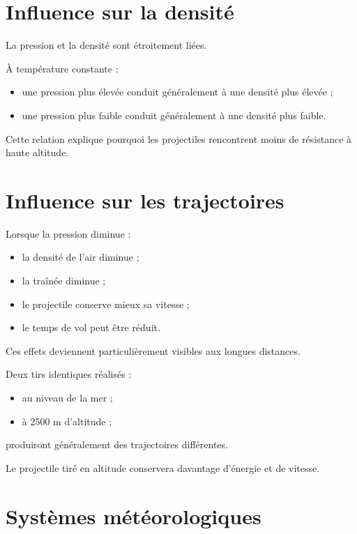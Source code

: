 \section{Influence sur la densité}

La pression et la densité sont étroitement liées.

À température constante :

\begin{itemize}
\item une pression plus élevée conduit généralement à une densité plus
élevée ;
\item une pression plus faible conduit généralement à une densité plus
faible.
\end{itemize}

Cette relation explique pourquoi les projectiles rencontrent moins de
résistance à haute altitude.

\section{Influence sur les trajectoires}

Lorsque la pression diminue :

\begin{itemize}
\item la densité de l'air diminue ;
\item la traînée diminue ;
\item le projectile conserve mieux sa vitesse ;
\item le temps de vol peut être réduit.
\end{itemize}

Ces effets deviennent particulièrement visibles aux longues distances.

\begin{exemple}

Deux tirs identiques réalisés :

\begin{itemize}
\item au niveau de la mer ;
\item à 2500 m d'altitude ;
\end{itemize}

produiront généralement des trajectoires différentes.

Le projectile tiré en altitude conservera davantage d'énergie et de vitesse.

\end{exemple}

\section{Systèmes météorologiques}

